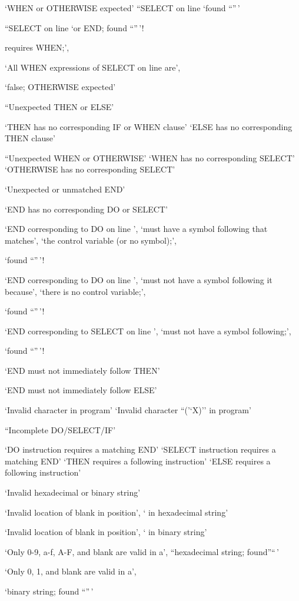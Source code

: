 `WHEN or OTHERWISE expected' ``SELECT on line `found ``''\,'

``SELECT on line `or END; found ``''\,'!

requires WHEN;',

`All WHEN expressions of SELECT on line are',

`false; OTHERWISE expected'

``Unexpected THEN or ELSE'

`THEN has no corresponding IF or WHEN clause' `ELSE has no corresponding
THEN clause'

``Unexpected WHEN or OTHERWISE' `WHEN has no corresponding SELECT'
`OTHERWISE has no corresponding SELECT'

`Unexpected or unmatched END'

`END has no corresponding DO or SELECT'

`END corresponding to DO on line ', `must have a symbol following that
matches', `the control variable (or no symbol);',

`found ``''\,'!

`END corresponding to DO on line ', `must not have a symbol following it
because', `there is no control variable;',

`found ``''\,'!

`END corresponding to SELECT on line ', `must not have a symbol
following;',

`found ``''\,'!

`END must not immediately follow THEN'

`END must not immediately follow ELSE'

`Invalid character in program' `Invalid character ``('`X)'' in program'

``Incomplete DO/SELECT/IF'

`DO instruction requires a matching END' `SELECT instruction requires a
matching END' `THEN requires a following instruction' `ELSE requires a
following instruction'

`Invalid hexadecimal or binary string'

`Invalid location of blank in position', ` in hexadecimal string'

`Invalid location of blank in position', ` in binary string'

`Only 0-9, a-f, A-F, and blank are valid in a', ``hexadecimal string;
found''``\,'

`Only 0, 1, and blank are valid in a',

`binary string; found ``''\,'

